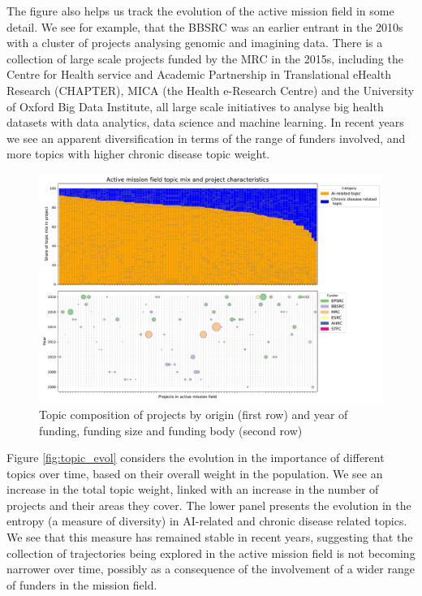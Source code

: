 \documentclass[11pt]{article}
\begin{document}
The figure also helps us track the evolution of the active mission field in some detail. We see for example, that the BBSRC was an earlier entrant in the 2010s with a cluster of projects analysing genomic and imagining data. There is a collection of large scale projects funded by the MRC in the 2015s, including the Centre for Health service and Academic Partnership in Translational eHealth Research (CHAPTER), MICA (the Health e-Research Centre) and the University of Oxford Big Data Institute, all large scale initiatives to analyse big health datasets with data analytics, data science and machine learning. In recent years we see an apparent diversification in terms of the range of funders involved, and more topics with higher chronic disease topic weight.

\begin{figure}[!ht]
    \centering
    \includegraphics[width=\textwidth]{figures/fig_19_proj_distr.pdf}
    \caption{Topic composition of projects by origin (first row) and year of funding, funding size and funding body (second row)}
    \label{fig:topic_comp}
\end{figure}

Figure \ref{fig:topic_evol} considers the evolution in the importance of different topics over time, based on their overall weight in the population. We see an increase in the total topic weight, linked with an increase in the number of projects and their areas they cover. The lower panel presents the evolution in the entropy (a measure of diversity) in AI-related and chronic disease related topics. We see that this measure has remained stable in recent years, suggesting that the collection of trajectories being explored in the active mission field is not becoming narrower over time, possibly as a consequence of the involvement of a wider range of funders in the mission field.
\end{document}
